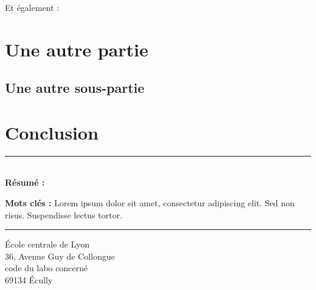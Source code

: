 \documentclass[a4paper,12pt,french]{article}
\begin{document}
Et également :




\section{Une autre partie}
\subsection{Une autre sous-partie}
\lipsum[2]




\section{Conclusion}


\lipsum[1]


%
%



\newpage
\thispagestyle{empty}

\vspace*{\fill}
\noindent\rule[2pt]{\textwidth}{0.5pt}\\
{\textbf{Résumé :}}
\lipsum[1]

{\noindent\textbf{Mots clés :}}
Lorem ipsum dolor sit amet, consectetur adipiscing elit. Sed non risus. Suspendisse lectus tortor.
\\
\noindent\rule[2pt]{\textwidth}{0.5pt}
\begin{center}
  École centrale de Lyon\\
  36, Avenue Guy de Collongue\\
  code du labo concerné\\
  69134 Écully
\end{center}
\vspace*{\fill}
\end{document}
